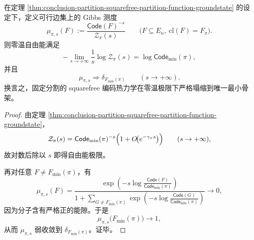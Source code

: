 \begin{corollary}\label{cor:conclusion-partition-squarefree-zero-temp-gibbs-collapse}
在定理 \ref{thm:conclusion-partition-squarefree-partition-function-groundstate} 的设定下，定义可行边集上的 Gibbs 测度
\[
\mu_{\pi,s}(F)
:=
\frac{\mathsf{Code}(F)^{-s}}{\mathcal Z_\pi(s)}
\qquad
\bigl(F\subseteq E_n,\ \mathrm{cl}(F)=F_\pi\bigr).
\]
则零温自由能满足
\[
-\lim_{s\to+\infty}\frac1s\log \mathcal Z_\pi(s)
=
\log \mathsf{Code}_{\min}(\pi),
\]
并且
\[
\mu_{\pi,s}\Longrightarrow \delta_{F_{\min}(\pi)}
\qquad
(s\to+\infty).
\]
换言之，固定分割的 squarefree 编码热力学在零温极限下严格塌缩到唯一最小骨架。
\end{corollary}
\begin{proof}
由定理 \ref{thm:conclusion-partition-squarefree-partition-function-groundstate}，
\[
\mathcal Z_\pi(s)
=
\mathsf{Code}_{\min}(\pi)^{-s}
\Bigl(1+O\!\bigl(e^{-\gamma_\pi s}\bigr)\Bigr)
\qquad
(s\to+\infty),
\]
故对数后除以 \(s\) 即得自由能极限。

再对任意 \(F\neq F_{\min}(\pi)\)，有
\[
\mu_{\pi,s}(F)
=
\frac{\exp\!\left(-s\log\frac{\mathsf{Code}(F)}{\mathsf{Code}_{\min}(\pi)}\right)}
{1+\sum_{G\neq F_{\min}(\pi)}\exp\!\left(-s\log\frac{\mathsf{Code}(G)}{\mathsf{Code}_{\min}(\pi)}\right)}
\longrightarrow 0,
\]
因为分子含有严格正的能隙。于是
\[
\mu_{\pi,s}\bigl(F_{\min}(\pi)\bigr)\longrightarrow 1,
\]
从而 \(\mu_{\pi,s}\) 弱收敛到 \(\delta_{F_{\min}(\pi)}\)。证毕。
\end{proof}
